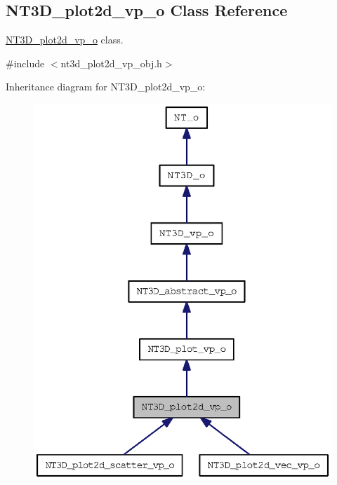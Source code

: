 \subsection{NT3D\_\-plot2d\_\-vp\_\-o Class Reference}
\label{class_n_t3_d__plot2d__vp__o}


\hyperlink{class_n_t3_d__plot2d__vp__o}{NT3D\_\-plot2d\_\-vp\_\-o} class.  




{\ttfamily \#include $<$nt3d\_\-plot2d\_\-vp\_\-obj.h$>$}



Inheritance diagram for NT3D\_\-plot2d\_\-vp\_\-o:
\nopagebreak
\begin{figure}[H]
\begin{center}
\leavevmode
\includegraphics[width=334pt]{class_n_t3_d__plot2d__vp__o__inherit__graph}
\end{center}
\end{figure}


